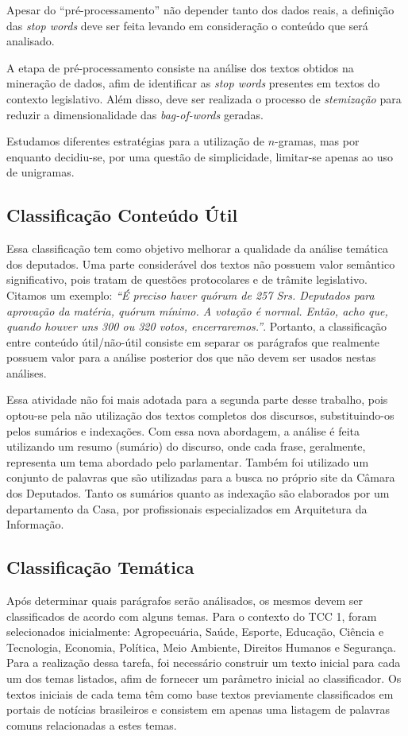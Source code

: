 Apesar do ``pré-processamento'' não depender tanto dos dados reais, a definição das \textit{stop words} deve ser feita levando em consideração o conteúdo que será analisado.

A etapa de pré-processamento consiste na análise dos textos obtidos na mineração de dados, afim de identificar as \textit{stop words} presentes em textos do contexto legislativo. Além disso, deve ser realizada o processo de \textit{stemização} para reduzir a dimensionalidade das \textit{bag-of-words} geradas.

Estudamos diferentes estratégias para a utilização de \(n\)-gramas, mas por enquanto decidiu-se, por uma questão de simplicidade, limitar-se apenas ao uso de unigramas.

\subsection{Classificação Conteúdo Útil}

Essa classificação tem como objetivo melhorar a qualidade da análise temática dos deputados. Uma parte considerável dos textos não possuem valor semântico significativo, pois tratam de questões protocolares e de trâmite legislativo. Citamos um exemplo: \textit{``É preciso haver quórum de 257 Srs. Deputados para aprovação da matéria, quórum mínimo. A votação é normal. Então, acho que, quando houver uns 300 ou 320 votos, encerraremos.''}. Portanto, a classificação entre conteúdo útil/não-útil consiste em separar os parágrafos que realmente possuem valor para a análise posterior dos que não devem ser usados nestas análises.

Essa atividade não foi mais adotada para a segunda parte desse trabalho, pois optou-se pela não utilização dos textos completos dos discursos, substituindo-os pelos sumários e indexações. Com essa nova abordagem, a análise é feita utilizando um resumo (sumário) do discurso, onde cada frase, geralmente, representa um tema abordado pelo parlamentar. Também foi utilizado um conjunto de palavras que são utilizadas para a busca no próprio site da Câmara dos Deputados. Tanto os sumários quanto as indexação são elaborados por um departamento da Casa, por profissionais especializados em Arquitetura da Informação.

\subsection{Classificação Temática}

Após determinar quais parágrafos serão análisados, os mesmos devem ser classificados de acordo com alguns temas. Para o contexto do TCC 1, foram selecionados inicialmente: Agropecuária, Saúde, Esporte, Educação, Ciência e Tecnologia, Economia, Política, Meio Ambiente, Direitos Humanos e Segurança. Para a realização dessa tarefa, foi necessário construir um texto inicial para cada um dos temas listados, afim de fornecer um parâmetro inicial ao classificador. Os textos iniciais de cada tema têm como base textos previamente classificados em portais de notícias brasileiros e consistem em apenas uma listagem de palavras comuns relacionadas a estes temas.

